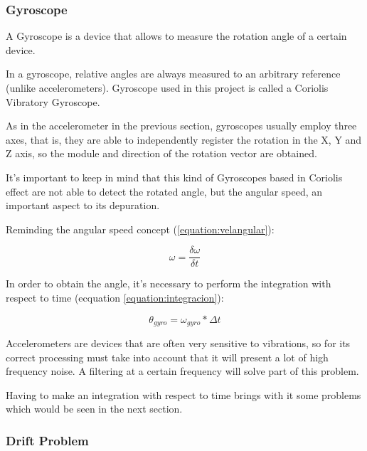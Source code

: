 \subsubsection{Gyroscope}
A Gyroscope is a device that allows to measure the rotation angle of a certain device. \newline

In a gyroscope, relative angles are always measured to an arbitrary reference (unlike accelerometers). Gyroscope used in this project is called a Coriolis Vibratory Gyroscope. \newline

As in the accelerometer in the previous section, gyroscopes usually employ three axes, that is, they are able to independently register the rotation in the X, Y and Z axis, so the module and direction of the rotation vector are obtained.\newline

It’s important to keep in mind that this kind of Gyroscopes based in Coriolis effect are not able to detect the rotated angle, but the angular speed, an important aspect to its depuration. \newline

Reminding the angular speed concept (\ref{equation:velangular}):

\begin{equation} \label{equation:velangular}
\omega = \frac{\delta \omega}{\delta t}
\end{equation}

In order to obtain the angle, it’s necessary to perform the integration with respect to time (ecquation \ref{equation:integracion}):

\begin{equation}\label{equation:integracion}
\theta_{gyro} = \omega_{gyro}*\Delta t
\end{equation}

Accelerometers are devices that are often very sensitive to vibrations, so for its correct processing must take into account that it will present a lot of high frequency noise. A filtering at a certain frequency will solve part of this problem.\newline

Having to make an integration with respect to time brings with it some problems which would be seen in the next section.

\subsubsection{Drift Problem}

